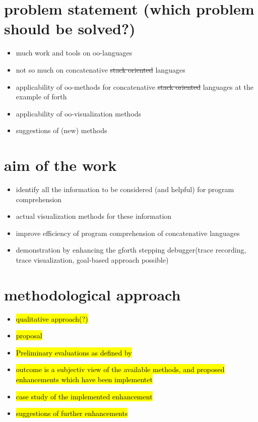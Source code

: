 \section{problem statement (which problem should be solved?)}

\begin{itemize}
\item much work and tools on oo-languages
\item not so much on concatenative \sout{stack oriented} languages
\item applicability of oo-methods for concatenative \sout{stack oriented} languages at the example of forth
\item applicability of oo-visualization methods
\item suggestions of (new) methods
\end{itemize}

\section{aim of the work}

\begin{itemize}
\item identify all the information to be considered (and helpful) for program comprehension
\item actual visualization methods for these information
\item improve efficiency of program comprehension of concatenative languages
\item demonstration by enhancing the gforth stepping debugger(trace recording, trace visualization, goal-based approach possible)
\end{itemize}

\section{methodological approach}

\begin{itemize}
\item \hl{qualitative approach(?)}
\item \hl{proposal}
\item \hl{Preliminary evaluations as defined by} \cite{Cornelissen:2009:SSP:1638616.1639301}
\item \hl{outcome is a subjectiv view of the available methods, and proposed enhancements which have been implementet}
\item \hl{case study of the implemented enhancement}
\item \hl{suggestions of further enhancements}
\end{itemize}

